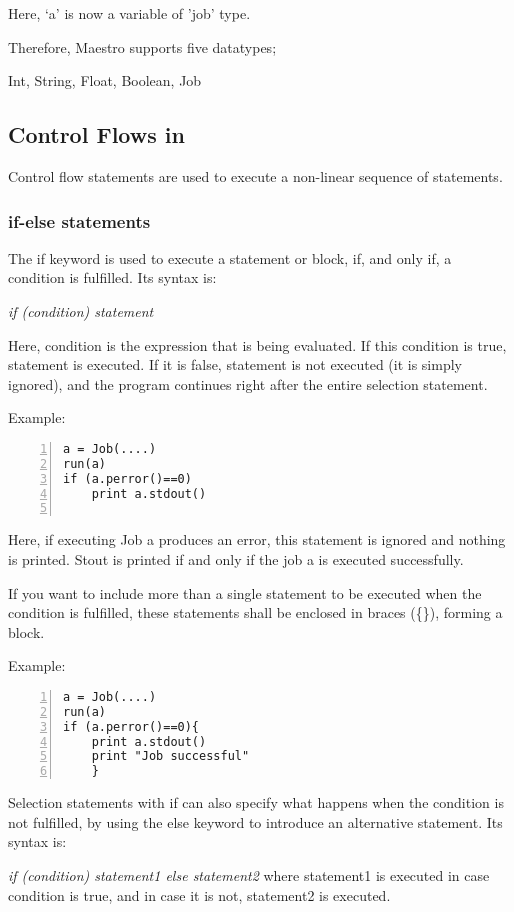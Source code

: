 Here, `a' is now a variable of 'job' type. 

Therefore, Maestro supports five datatypes;

Int, String, Float, Boolean, Job

\subsection*{Control Flows in \lang{}}
Control flow statements are used to execute a non-linear sequence of statements.
\subsubsection*{if-else statements}
The if keyword is used to execute a statement or block, if, and only if, a condition is fulfilled. Its syntax is:

\textit{if (condition) statement}

Here, condition is the expression that is being evaluated. If this condition is true, statement is executed. If it is false, statement is not executed (it is simply ignored), and the program continues right after the entire selection statement.

Example:
\begin{Verbatim}[numbers=left]
a = Job(....)
run(a)
if (a.perror()==0)
    print a.stdout()
    
\end{Verbatim}

Here, if executing Job a produces an error, this statement is ignored and nothing is printed. Stout is printed if and only if the job a is executed successfully.

If you want to include more than a single statement to be executed when the condition is fulfilled, these statements shall be enclosed in braces (\{\}), forming a block.

Example:

\begin{Verbatim}[numbers=left]
a = Job(....)
run(a)
if (a.perror()==0){
    print a.stdout()
    print "Job successful"
    }
\end{Verbatim}
Selection statements with if can also specify what happens when the condition is not fulfilled, by using the else keyword to introduce an alternative statement. Its syntax is:

\textit{if (condition) statement1 else statement2}
where statement1 is executed in case condition is true, and in case it is not, statement2 is executed.

